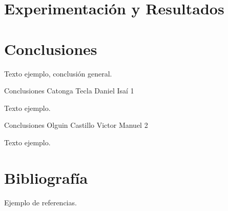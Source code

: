 \documentclass[12pt,twoside]{article}
\begin{document}
\begin{itemize}
\end{itemize}
\newpage
\section{Experimentación y Resultados}

\newpage
\section{Conclusiones}

Texto ejemplo, conclusión general.
\medskip

Conclusiones Catonga Tecla Daniel Isaí 1
\par
Texto ejemplo.

\medskip

Conclusiones Olguin Castillo Victor Manuel 2
\par
Texto ejemplo.

\newpage
\section{Bibliograf\'ia}

Ejemplo de referencias.
\printbibliography[title={ }]
\end{document}
